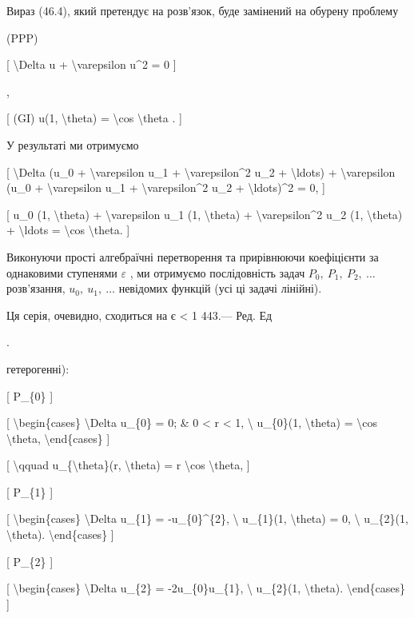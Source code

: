 \documentclass[
]{article}
\begin{document}
{Вираз (46.4), який претендує на розв'язок, буде замінений на обурену
проблему

(PPP)

{[} \textbackslash Delta u + \textbackslash varepsilon u\^{}2 = 0 {]}

,

{[} (GI) u(1, \textbackslash theta) = \textbackslash cos
\textbackslash theta . {]}

У результаті ми отримуємо

{[} \textbackslash Delta (u\_0 + \textbackslash varepsilon u\_1 +
\textbackslash varepsilon\^{}2 u\_2 + \textbackslash ldots) +
\textbackslash varepsilon (u\_0 + \textbackslash varepsilon u\_1 +
\textbackslash varepsilon\^{}2 u\_2 + \textbackslash ldots)\^{}2 = 0,
{]}

{[} u\_0 (1, \textbackslash theta) + \textbackslash varepsilon u\_1 (1,
\textbackslash theta) + \textbackslash varepsilon\^{}2 u\_2 (1,
\textbackslash theta) + \textbackslash ldots = \textbackslash cos
\textbackslash theta. {]}

Виконуючи прості алгебраїчні перетворення та прирівнюючи коефіцієнти за
однаковими ступенями \(\varepsilon\) , ми отримуємо послідовність задач
\(P_0,\ P_1,\ P_2,\ \dots\) розв'язання, \(u_0,\ u_1,\ \dots\) невідомих
функцій (усі ці задачі лінійні).

Ця серія, очевидно, сходиться на \textbar{} є \textbar{} \textless{} 1
443.--- Ред. Ед

.

гетерогенні):

{[} P\_\{0\} {]}

{[} \textbackslash begin\{cases\} \textbackslash Delta u\_\{0\} = 0; \&
0 \textless{} r \textless{} 1, \textbackslash{} u\_\{0\}(1,
\textbackslash theta) = \textbackslash cos \textbackslash theta,
\textbackslash end\{cases\} {]}

{[} \textbackslash qquad u\_\{\textbackslash theta\}(r,
\textbackslash theta) = r \textbackslash cos \textbackslash theta, {]}

{[} P\_\{1\} {]}

{[} \textbackslash begin\{cases\} \textbackslash Delta u\_\{1\} =
-u\_\{0\}\^{}\{2\}, \textbackslash{} u\_\{1\}(1, \textbackslash theta) =
0, \textbackslash{} u\_\{2\}(1, \textbackslash theta).
\textbackslash end\{cases\} {]}

{[} P\_\{2\} {]}

{[} \textbackslash begin\{cases\} \textbackslash Delta u\_\{2\} =
-2u\_\{0\}u\_\{1\}, \textbackslash{} u\_\{2\}(1, \textbackslash theta).
\textbackslash end\{cases\} {]}

}
\end{document}
